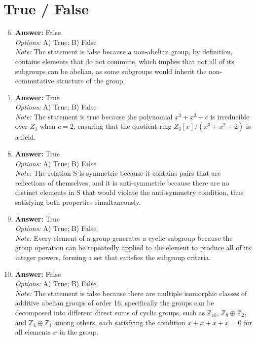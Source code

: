 \documentclass[12pt]{article}
\begin{document}
\section*{True / False}
\begin{enumerate}[label=\arabic*.]
\setcounter{enumi}{5}
\item \textbf{Answer:} False
\\ \textit{Options:} A) True; B) False
\\ \textit{Note:} The statement is false because a non-abelian group, by definition, contains elements that do not commute, which implies that not all of its subgroups can be abelian, as some subgroups would inherit the non-commutative structure of the group.
\item \textbf{Answer:} True
\\ \textit{Options:} A) True; B) False
\\ \textit{Note:} The statement is true because the polynomial \(x^3 + x^2 + c\) is irreducible over \(Z_3\) when \(c = 2\), ensuring that the quotient ring \(Z_3[x]/(x^3 + x^2 + 2)\) is a field.
\item \textbf{Answer:} True
\\ \textit{Options:} A) True; B) False
\\ \textit{Note:} The relation S is symmetric because it contains pairs that are reflections of themselves, and it is anti-symmetric because there are no distinct elements in S that would violate the anti-symmetry condition, thus satisfying both properties simultaneously.
\item \textbf{Answer:} True
\\ \textit{Options:} A) True; B) False
\\ \textit{Note:} Every element of a group generates a cyclic subgroup because the group operation can be repeatedly applied to the element to produce all of its integer powers, forming a set that satisfies the subgroup criteria.
\item \textbf{Answer:} False
\\ \textit{Options:} A) True; B) False
\\ \textit{Note:} The statement is false because there are multiple isomorphic classes of additive abelian groups of order 16, specifically the groups can be decomposed into different direct sums of cyclic groups, such as \( \mathbb{Z}_{16} \), \( \mathbb{Z}_8 \oplus \mathbb{Z}_2 \), and \( \mathbb{Z}_4 \oplus \mathbb{Z}_4 \) among others, each satisfying the condition \( x + x + x + x = 0 \) for all elements \( x \) in the group.
\end{enumerate}
\end{document}
